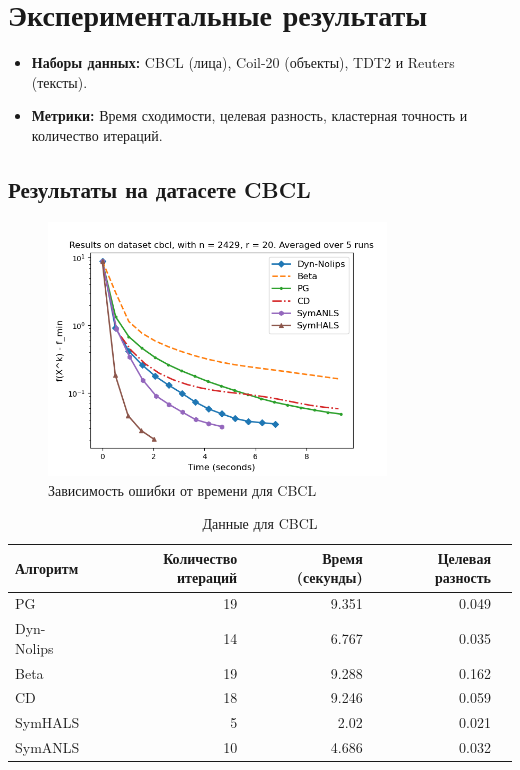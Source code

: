 \documentclass[a4paper,11pt]{article}
\begin{document}
\section{Экспериментальные результаты} 
\begin{itemize} 
	\item \textbf{Наборы данных:} CBCL (лица), Coil-20 (объекты), TDT2 и Reuters (тексты).
	\item \textbf{Метрики:} Время сходимости, целевая разность, кластерная точность и количество итераций.
\end{itemize}
\newpage

\subsection{Результаты на датасете CBCL}
\begin{figure}[h!]
    \centering \includegraphics[width=0.8\textwidth]{my_plot_cbcl.png}
    \caption{Зависимость ошибки от времени для CBCL}
    \label{fig:cbcl}
\end{figure}
\begin{table}[h!]
    \centering
    \caption{Данные для CBCL}
    \label{tab:clustering_accuracy_cbcl}
    \begin{tabular}{|l|r|r|r|r|}
        \hline
        Алгоритм & Количество итераций & Время (секунды) & Целевая разность \\
        \hline
        PG & 19 & 9.351 & 0.049 \\
        Dyn-Nolips & 14 & 6.767 & 0.035 \\
        Beta & 19 & 9.288 & 0.162 \\
        CD & 18 & 9.246 & 0.059 \\
        SymHALS & 5 & 2.02 & 0.021 \\
        SymANLS & 10 & 4.686 & 0.032 \\
        \hline
    \end{tabular}
    \end{table}
\newpage
\end{document}
